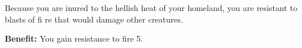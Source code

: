 
Because you are inured to the hellish heat of your homeland, you are resistant to blasts of fi re that would damage other creatures.

\textbf{Benefit:} You gain resistance to fire 5.